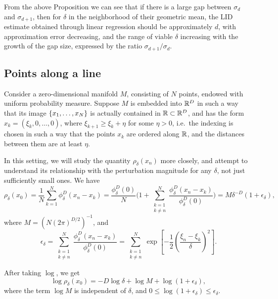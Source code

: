 From the above Proposition we can see that if there is a large gap between $\sigma_d$ and $\sigma_{d+1}$, then for $\delta$ in the neighborhood of their geometric mean, the LID estimate obtained through linear regression should be approximately $d$, with approximation error decreasing, and the range of viable $\delta$ increasing with the growth of the gap size, expressed by the ratio $\sigma_{d+1}/\sigma_d$.


\subsection{Points along a line}

Consider a zero-dimensional manifold $M$, consisting of $N$ points, endowed with uniform probability measure. Suppose $M$ is embedded into $\mathbb{R}^D$ in such a way that its image $\left\{{x_1, \dots, x_N}\right\}$ is actually contained in $\mathbb{R} \subset \mathbb{R}^D$, and has the form $x_k = (\xi_k, 0, \dots, 0)$, where $\xi_{k+1} \geq \xi_k + \eta$ for some $\eta > 0$, i.e.\ the indexing is chosen in such a way that the points $x_k$ are ordered along $\mathbb{R}$, and the distances between them are at least $\eta$.

In this setting, we will study the quantity $\rho_\delta(x_n)$ more closely, and attempt to understand its relationship with the perturbation magnitude for any $\delta$, not just sufficiently small ones. We have
\begin{equation}
    \rho_\delta(x_0) 
    = \frac{1}{N}\sum_{k=1}^N \phi^D_\delta(x_n-x_k) 
    = \frac{\phi^D_\delta(0)}{N} \Bigg( 1 + \sum_{\substack{k =1\\ k\ne n}}^N \frac{\phi^D_\delta(x_n-x_k) }{\phi^D_\delta(0)} \Bigg)
    = M \delta^{-D} \left( 1 + \epsilon_\delta\right),
\end{equation}
where $M=({N(2\pi)^{D/2}})^{-1}$, and
\begin{equation}
    \epsilon_\delta 
    = \sum_{\substack{k =1\\ k\ne n}}^N \frac{\phi^D_\delta(x_n-x_k)}{\phi^D_\delta(0)}
    = \sum_{\substack{k =1\\ k\ne n}}^N \exp \left[ -\frac{1}{2} \left(\frac{\xi_n-\xi_k}{\delta}\right)^2\right].
\end{equation}

After taking $\log$, we get
\begin{equation}
    \log \rho_\delta(x_0) = -D\log\delta + \log M + \log(1+ \epsilon_\delta),
\end{equation}
where the term $\log M$ is independent of $\delta$, and $0 \leq \log(1+\epsilon_\delta) \leq \epsilon_\delta$.


